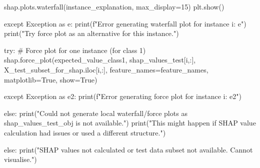 \begin{ffcode}
                shap.plots.waterfall(instance_explanation, max_display=15)
                plt.show()

            except Exception as e:
                print(f"Error generating waterfall plot for instance {i}: {e}")
                print("Try force plot as an alternative for this instance.")

                try:
                    # Force plot for one instance (for class 1)
                    shap.force_plot(expected_value_class1,
                                    shap_values_test[i,:],
                                    X_test_subset_for_shap.iloc[i,:],
                                    feature_names=feature_names,
                                    matplotlib=True,
                                    show=True)

                except Exception as e2:
                    print(f"Error generating force plot for instance {i}: {e2}")

    else:
        print("Could not generate local waterfall/force plots as shap_values_test_obj is not available.")
        print("This might happen if SHAP value calculation had issues or used a different structure.")

else:
    print("SHAP values not calculated or test data subset not available. Cannot visualise.")
\end{ffcode}